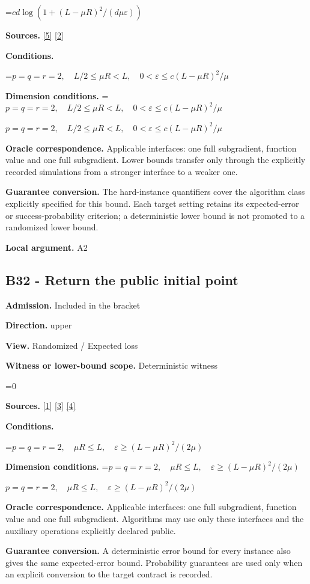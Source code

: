\documentclass[10pt,a4paper]{article}
\newcommand{\AtlasMath}[1]{\par\begingroup\centering\setbox0=\hbox{$\displaystyle #1$}\ifdim\wd0>1.4\linewidth\typeout{ATLAS WIDE FORMULA: \the\wd0}\fi\ifdim\wd0>\linewidth\resizebox{\linewidth}{!}{\box0}\else\box0\fi\par\endgroup}
\newcommand{\AtlasInlineMath}[1]{\begingroup\setbox0=\hbox{$#1$}\ifdim\wd0>.4\linewidth\endgroup\AtlasMath{#1}\else\endgroup$#1$\fi}
\begin{document}
\AtlasMath{cd\log(1+(L-\mu R)^2/(d\mu\varepsilon))}
\textbf{Sources.} \href{https://arxiv.org/pdf/1407.5144}{[5]} \href{https://arxiv.org/pdf/1401.1792}{[2]}

\textbf{Conditions.} 
\AtlasMath{p=q=r=2,\quad L/2\le\mu R<L,\quad0<\varepsilon\le c(L-\mu R)^2/\mu}


\textbf{Dimension conditions.} \AtlasInlineMath{p=q=r=2,\quad L/2\le\mu R<L,\quad0<\varepsilon\le c(L-\mu R)^2/\mu}

\textbf{Oracle correspondence.} Applicable interfaces: one full subgradient, function value and one full subgradient. Lower bounds transfer only through the explicitly recorded simulations from a stronger interface to a weaker one.

\textbf{Guarantee conversion.} The hard-instance quantifiers cover the algorithm class explicitly specified for this bound. Each target setting retains its expected-error or success-probability criterion; a deterministic lower bound is not promoted to a randomized lower bound.

\textbf{Local argument.} A2

\subsection{B32 - Return the public initial point}
\textbf{Admission.} Included in the bracket

\textbf{Direction.} upper

\textbf{View.} Randomized / Expected loss

\textbf{Witness or lower-bound scope.} Deterministic witness

\AtlasMath{0}
\textbf{Sources.} \href{https://arxiv.org/pdf/1405.4980}{[1]} \href{https://www2.isye.gatech.edu/~nemirovs/MOR_AccuracyCertificates.pdf}{[3]} \href{https://arxiv.org/pdf/2609.20701}{[4]}

\textbf{Conditions.} 
\AtlasMath{p=q=r=2,\quad\mu R\le L,\quad\varepsilon\ge(L-\mu R)^2/(2\mu)}


\textbf{Dimension conditions.} \AtlasInlineMath{p=q=r=2,\quad\mu R\le L,\quad\varepsilon\ge(L-\mu R)^2/(2\mu)}

\textbf{Oracle correspondence.} Applicable interfaces: one full subgradient, function value and one full subgradient. Algorithms may use only these interfaces and the auxiliary operations explicitly declared public.

\textbf{Guarantee conversion.} A deterministic error bound for every instance also gives the same expected-error bound. Probability guarantees are used only when an explicit conversion to the target contract is recorded.
\end{document}
